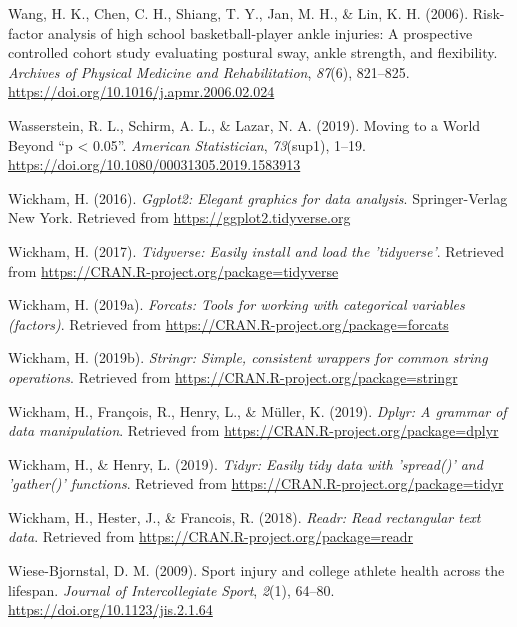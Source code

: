 \documentclass[man,floatsintext]{apa6}
\begin{document}
\leavevmode\hypertarget{ref-Wang2006}{}%
Wang, H. K., Chen, C. H., Shiang, T. Y., Jan, M. H., \& Lin, K. H. (2006). Risk-factor analysis of high school basketball-player ankle injuries: A prospective controlled cohort study evaluating postural sway, ankle strength, and flexibility. \emph{Archives of Physical Medicine and Rehabilitation}, \emph{87}(6), 821--825. \url{https://doi.org/10.1016/j.apmr.2006.02.024}

\leavevmode\hypertarget{ref-Wasserstein2019}{}%
Wasserstein, R. L., Schirm, A. L., \& Lazar, N. A. (2019). Moving to a World Beyond ``p \textless{} 0.05''. \emph{American Statistician}, \emph{73}(sup1), 1--19. \url{https://doi.org/10.1080/00031305.2019.1583913}

\leavevmode\hypertarget{ref-R-ggplot2}{}%
Wickham, H. (2016). \emph{Ggplot2: Elegant graphics for data analysis}. Springer-Verlag New York. Retrieved from \url{https://ggplot2.tidyverse.org}

\leavevmode\hypertarget{ref-R-tidyverse}{}%
Wickham, H. (2017). \emph{Tidyverse: Easily install and load the 'tidyverse'}. Retrieved from \url{https://CRAN.R-project.org/package=tidyverse}

\leavevmode\hypertarget{ref-R-forcats}{}%
Wickham, H. (2019a). \emph{Forcats: Tools for working with categorical variables (factors)}. Retrieved from \url{https://CRAN.R-project.org/package=forcats}

\leavevmode\hypertarget{ref-R-stringr}{}%
Wickham, H. (2019b). \emph{Stringr: Simple, consistent wrappers for common string operations}. Retrieved from \url{https://CRAN.R-project.org/package=stringr}

\leavevmode\hypertarget{ref-R-dplyr}{}%
Wickham, H., François, R., Henry, L., \& Müller, K. (2019). \emph{Dplyr: A grammar of data manipulation}. Retrieved from \url{https://CRAN.R-project.org/package=dplyr}

\leavevmode\hypertarget{ref-R-tidyr}{}%
Wickham, H., \& Henry, L. (2019). \emph{Tidyr: Easily tidy data with 'spread()' and 'gather()' functions}. Retrieved from \url{https://CRAN.R-project.org/package=tidyr}

\leavevmode\hypertarget{ref-R-readr}{}%
Wickham, H., Hester, J., \& Francois, R. (2018). \emph{Readr: Read rectangular text data}. Retrieved from \url{https://CRAN.R-project.org/package=readr}

\leavevmode\hypertarget{ref-Wiese-Bjornstal2009}{}%
Wiese-Bjornstal, D. M. (2009). Sport injury and college athlete health across the lifespan. \emph{Journal of Intercollegiate Sport}, \emph{2}(1), 64--80. \url{https://doi.org/10.1123/jis.2.1.64}
\end{document}
